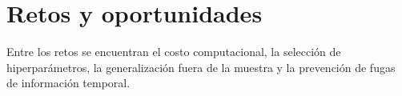 \section{Retos y oportunidades}

Entre los retos se encuentran el costo computacional, la selección de hiperparámetros, la generalización fuera de la muestra y la prevención de fugas de información temporal.
